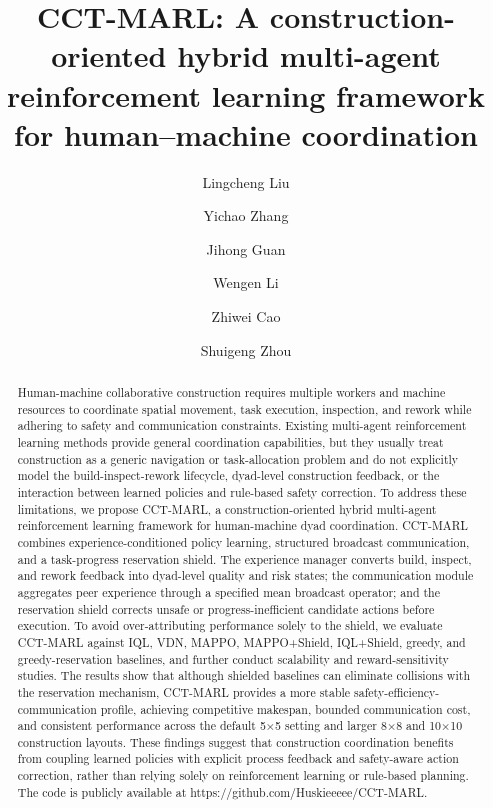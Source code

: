 \documentclass[fleqn,10pt]{wlpeerj}
\title{CCT-MARL: A construction-oriented hybrid multi-agent reinforcement learning framework for human--machine coordination}
\date{}
\author[1]{Lingcheng Liu}
\author[1]{Yichao Zhang}
\author[1]{Jihong Guan}
\author[1]{Wengen Li}
\author[1]{Zhiwei Cao}
\author[2]{Shuigeng Zhou}
\affil[1]{School of Computer Science and Technology, Tongji University, Shanghai, China}
\affil[2]{School of Computer Science, Fudan University, Shanghai, China}
\begin{document}
\flushbottom
\maketitle

\begin{abstract}
Human-machine collaborative construction requires multiple workers and machine resources to coordinate spatial movement, task execution, inspection, and rework while adhering to safety and communication constraints. Existing multi-agent reinforcement learning methods provide general coordination capabilities, but they usually treat construction as a generic navigation or task-allocation problem and do not explicitly model the build-inspect-rework lifecycle, dyad-level construction feedback, or the interaction between learned policies and rule-based safety correction. To address these limitations, we propose CCT-MARL, a construction-oriented hybrid multi-agent reinforcement learning framework for human-machine dyad coordination. CCT-MARL combines experience-conditioned policy learning, structured broadcast communication, and a task-progress reservation shield. The experience manager converts build, inspect, and rework feedback into dyad-level quality and risk states; the communication module aggregates peer experience through a specified mean broadcast operator; and the reservation shield corrects unsafe or progress-inefficient candidate actions before execution. To avoid over-attributing performance solely to the shield, we evaluate CCT-MARL against IQL, VDN, MAPPO, MAPPO+Shield, IQL+Shield, greedy, and greedy-reservation baselines, and further conduct scalability and reward-sensitivity studies. The results show that although shielded baselines can eliminate collisions with the reservation mechanism, CCT-MARL provides a more stable safety-efficiency-communication profile, achieving competitive makespan, bounded communication cost, and consistent performance across the default 5×5 setting and larger 8×8 and 10×10 construction layouts. These findings suggest that construction coordination benefits from coupling learned policies with explicit process feedback and safety-aware action correction, rather than relying solely on reinforcement learning or rule-based planning. The code is publicly available at https://github.com/Huskieeeee/CCT-MARL.

\end{abstract}

\linenumbers

\end{document}
